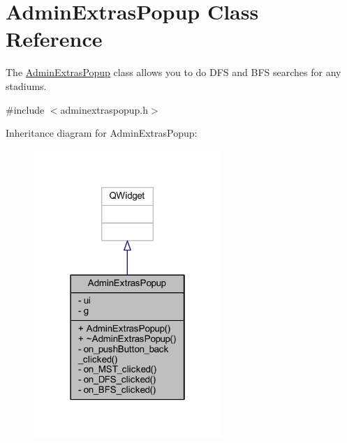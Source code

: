 \hypertarget{class_admin_extras_popup}{}\section{Admin\+Extras\+Popup Class Reference}
\label{class_admin_extras_popup}


The \hyperlink{class_admin_extras_popup}{Admin\+Extras\+Popup} class allows you to do D\+FS and B\+FS searches for any stadiums.  




{\ttfamily \#include $<$adminextraspopup.\+h$>$}



Inheritance diagram for Admin\+Extras\+Popup\+:
\nopagebreak
\begin{figure}[H]
\begin{center}
\leavevmode
\includegraphics[width=202pt]{class_admin_extras_popup__inherit__graph}
\end{center}
\end{figure}


